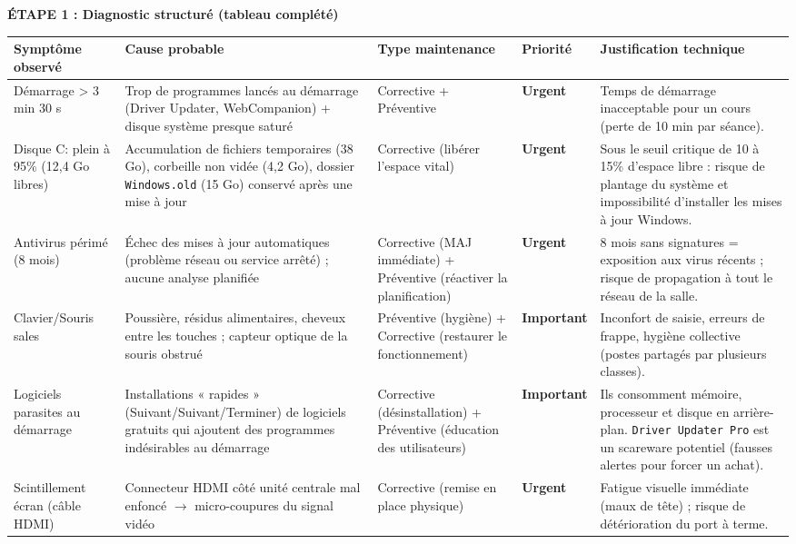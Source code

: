 \documentclass[11pt]{article}
\newcounter{popsec}
\newcounter{popsub}
\newcommand{\courssub}[1]{%
  \stepcounter{popsub}%
  \par\vspace{9pt}\noindent{\popxbold\fontsize{11.5}{13}\selectfont\color{popink}{\color{poporange}\thepopsec.\thepopsub}\hspace{6pt}#1}\par\nopagebreak\vspace{4pt}
}
\begin{document}
\courssub{Démarche et corrigé commenté}
\begin{exoresolu}
\textbf{ÉTAPE 1 : Diagnostic structuré (tableau complété)}

\begin{center}
\begin{tabularx}{\linewidth}{|X|X|l|l|X|}
\hline
\rowcolor{popblueL}
\textbf{Symptôme observé} & \textbf{Cause probable} & \textbf{Type maintenance} & \textbf{Priorité} & \textbf{Justification technique} \\
\hline
Démarrage > 3 min 30 s & Trop de programmes lancés au démarrage (Driver Updater, WebCompanion) + disque système presque saturé & Corrective + Préventive & \textbf{Urgent} & Temps de démarrage inacceptable pour un cours (perte de 10 min par séance). \\
\hline
Disque C: plein à 95\% (12,4 Go libres) & Accumulation de fichiers temporaires (38 Go), corbeille non vidée (4,2 Go), dossier \texttt{Windows.old} (15 Go) conservé après une mise à jour & Corrective (libérer l'espace vital) & \textbf{Urgent} & Sous le seuil critique de 10 à 15\% d'espace libre : risque de plantage du système et impossibilité d'installer les mises à jour Windows. \\
\hline
Antivirus périmé (8 mois) & Échec des mises à jour automatiques (problème réseau ou service arrêté) ; aucune analyse planifiée & Corrective (MAJ immédiate) + Préventive (réactiver la planification) & \textbf{Urgent} & 8 mois sans signatures = exposition aux virus récents ; risque de propagation à tout le réseau de la salle. \\
\hline
Clavier/Souris sales & Poussière, résidus alimentaires, cheveux entre les touches ; capteur optique de la souris obstrué & Préventive (hygiène) + Corrective (restaurer le fonctionnement) & \textbf{Important} & Inconfort de saisie, erreurs de frappe, hygiène collective (postes partagés par plusieurs classes). \\
\hline
Logiciels parasites au démarrage & Installations « rapides » (Suivant/Suivant/Terminer) de logiciels gratuits qui ajoutent des programmes indésirables au démarrage & Corrective (désinstallation) + Préventive (éducation des utilisateurs) & \textbf{Important} & Ils consomment mémoire, processeur et disque en arrière-plan. \texttt{Driver Updater Pro} est un scareware potentiel (fausses alertes pour forcer un achat). \\
\hline
Scintillement écran (câble HDMI) & Connecteur HDMI côté unité centrale mal enfoncé $\rightarrow$ micro-coupures du signal vidéo & Corrective (remise en place physique) & \textbf{Urgent} & Fatigue visuelle immédiate (maux de tête) ; risque de détérioration du port à terme. \\
\hline
\end{tabularx}
\end{center}


\end{exoresolu}
\end{document}
